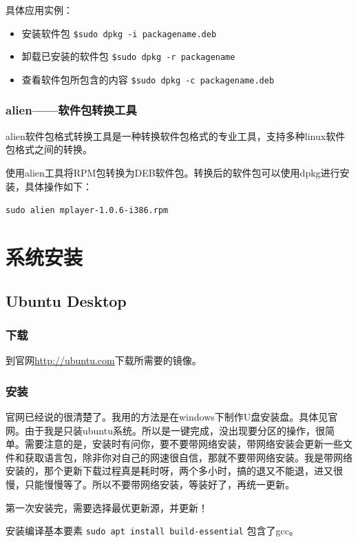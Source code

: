 具体应用实例：
\begin{itemize}
\item 安装软件包\quad
\verb*|$sudo dpkg -i packagename.deb|

\item 卸载已安装的软件包\quad
\verb*|$sudo dpkg -r packagename|

\item 查看软件包所包含的内容\quad
\verb*|$sudo dpkg -c packagename.deb|
\end{itemize}



\subsection{alien——软件包转换工具}
alien软件包格式转换工具是一种转换软件包格式的专业工具，支持多种linux软件包格式之间的转换。

使用alien工具将RPM包转换为DEB软件包。转换后的软件包可以使用dpkg进行安装，具体操作如下：

\verb|sudo alien mplayer-1.0.6-i386.rpm|





\chapter{系统安装}
\section{Ubuntu Desktop} 
 \subsection{下载}
  到官网\url{http://ubuntu.com}下载所需要的镜像。 

\subsection{安装}   
 官网已经说的很清楚了。我用的方法是在windows下制作U盘安装盘。具体见官网。由于我是只装ubuntu系统。所以是一键完成，没出现要分区的操作，很简单。需要注意的是，安装时有问你，要不要带网络安装，带网络安装会更新一些文件和获取语言包，除非你对自己的网速很自信，那就不要带网络安装。我是带网络安装的，那个更新下载过程真是耗时呀，两个多小时，搞的退又不能退，进又很慢，只能慢慢等了。所以不要带网络安装，等装好了，再统一更新。
 
第一次安装完，需要选择最优更新源，并更新！

安装编译基本要素 \verb|sudo apt install build-essential| 包含了gcc。

